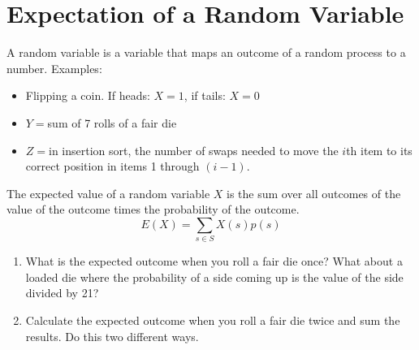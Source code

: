 \documentclass[12pt]{report}
\begin{document}
\section{Expectation of a Random Variable}\label{sec:expectation-of-a-random-variable}
A random variable is a variable that maps an outcome of a random process to a number. Examples:
\begin{itemize}
	\item Flipping a coin. If heads: $X=1$, if tails: $X=0$
	\item $Y=$sum of 7 rolls of a fair die 
	\item $Z=$in insertion sort, the number of swaps needed to move the $i$th item to its correct position in items 1 through $(i-1)$. 
\end{itemize}
The expected value of a random variable $X$ is the sum over all outcomes of the value of the outcome times the probability of the outcome. \[ E(X)=\sum_{s\in S} X\left(s\right)p\left(s\right) \]

\begin{enumerate}[label=\arabic*., start=4]
    \item What is the expected outcome when you roll a fair die once? What about a loaded die where the probability of a side coming up is the value of the side divided by 21? \answer{\[ 1\left(\frac{1}{6}\right) + 2\left(\frac{1}{6}\right) + 3\left(\frac{1}{6}\right) + 4\left(\frac{1}{6}\right) + 5\left(\frac{1}{6}\right) + 6\left(\frac{1}{6}\right) = \frac{21}{6} = 3.5  \] \[ 1\left( \frac{1}{21} \right) + 2\left( \frac{2}{21} \right) + 3\left( \frac{3}{21} \right) + 4\left( \frac{4}{21} \right) + 5\left( \frac{5}{21} \right) + 6\left( \frac{6}{21} \right) = \frac{1+4+9+16+25+36}{21} = \frac{91}{21}=\frac{13}{3}= 4.\bar{3}  \] } %
	\item Calculate the expected outcome when you roll a fair die twice and sum the results. Do this two different ways. 
\end{enumerate}
\end{document}
